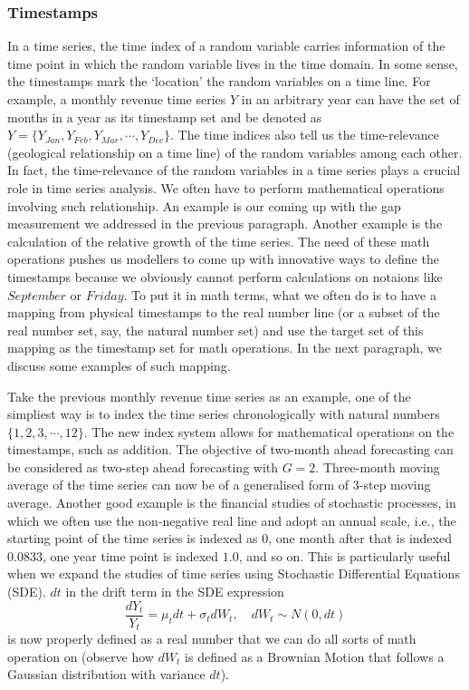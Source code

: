 \subsubsection{Timestamps}
In a time series, the time index of a random variable carries information of the time point in which the random variable lives in the time domain. In some sense, the timestamps mark the `location' the random variables on a time line. For example, a monthly revenue time series $Y$ in an arbitrary year can have the set of months in a year as its timestamp set and be denoted as $Y = \{ Y_{Jan}, Y_{Feb}, Y_{Mar}, \cdots, Y_{Dec} \}$. The time indices also tell us the time-relevance (geological relationship on a time line) of the random variables among each other. In fact, the time-relevance of the random variables in a time series plays a crucial role in time series analysis. We often have to perform mathematical operations involving such relationship. An example is our coming up with the gap measurement we addressed in the previous paragraph. Another example is the calculation of the relative growth of the time series. The need of these math operations pushes us modellers to come up with innovative ways to define the timestamps because we obviously cannot perform calculations on notaions like $September$ or $Friday$. To put it in math terms, what we often do is to have a mapping from physical timestamps to the real number line (or a subset of the real number set, say, the natural number set) and use the target set of this mapping as the timestamp set for math operations. In the next paragraph, we discuss some examples of such mapping.

Take the previous monthly revenue time series as an example, one of the simpliest way is to index the time series chronologically with natural numbers $\{ 1, 2, 3, \cdots, 12 \}$. The new index system allows for mathematical operations on the timestamps, such as addition. The objective of two-month ahead forecasting can be considered as two-step ahead forecasting with $G = 2$. Three-month moving average of the time series can now be of a generalised form of 3-step moving average. Another good example is the financial studies of stochastic processes, in which we often use the non-negative real line and adopt an annual scale, i.e., the starting point of the time series is indexed as $0$, one month after that is indexed $0.0833$, one year time point is indexed $1.0$, and so on. This is particularly useful when we expand the studies of time series using Stochastic Differential Equations (SDE). $dt$ in the drift term in the SDE expression
\begin{equation*}
    \frac{dY_t}{Y_t} = \mu_t dt + \sigma_t dW_t, \quad dW_t \sim N(0, dt)
\end{equation*}
is now properly defined as a real number that we can do all sorts of math operation on (observe how $dW_t$ is defined as a Brownian Motion that follows a Gaussian distribution with variance $dt$).

